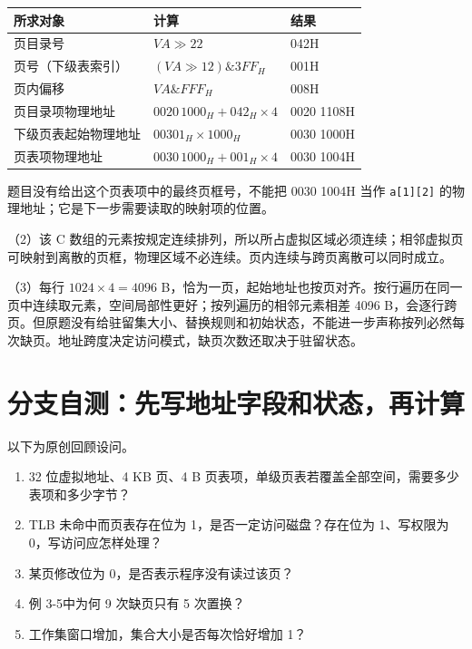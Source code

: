\begin{wideblock}

\par\medskip\noindent\begin{minipage}{\linewidth}\fontsize{9.3}{12}\selectfont\begin{tabularx}{\linewidth}{@{}YYY@{}}
\toprule\noalign{}
所求对象 & 计算 & 结果 \\
\midrule\noalign{}


页目录号 & \(VA\gg22\) & 042H \\
页号（下级表索引） & \((VA\gg12)\mathbin{\&}3FF_H\) & 001H \\
页内偏移 & \(VA\mathbin{\&}FFF_H\) & 008H \\
页目录项物理地址 & \(0020\,1000_H+042_H\times4\) & 0020 1108H \\
下级页表起始物理地址 & \(00301_H\times1000_H\) & 0030 1000H \\
页表项物理地址 & \(0030\,1000_H+001_H\times4\) & 0030 1004H \\
\bottomrule\end{tabularx}
\end{minipage}\par\medskip

\end{wideblock}

题目没有给出这个页表项中的最终页框号，不能把 0030 1004H 当作 \texttt{a[1][2]} 的物理地址；它是下一步需要读取的映射项的位置。

（2）该 C 数组的元素按规定连续排列，所以所占虚拟区域必须连续；相邻虚拟页可映射到离散的页框，物理区域不必连续。页内连续与跨页离散可以同时成立。

（3）每行 \(1024\times4=4096\) B，恰为一页，起始地址也按页对齐。按行遍历在同一页中连续取元素，空间局部性更好；按列遍历的相邻元素相差 4096 B，会逐行跨页。但原题没有给驻留集大小、替换规则和初始状态，不能进一步声称按列必然每次缺页。地址跨度决定访问模式，缺页次数还取决于驻留状态。

\section{分支自测：先写地址字段和状态，再计算}\label{OS03-5-review}

以下为原创回顾设问。

\begin{enumerate}
\def\labelenumi{\arabic{enumi}.}
\tightlist
\item
  32 位虚拟地址、4 KB 页、4 B 页表项，单级页表若覆盖全部空间，需要多少表项和多少字节？
\item
  TLB 未命中而页表存在位为 1，是否一定访问磁盘？存在位为 1、写权限为 0，写访问应怎样处理？
\item
  某页修改位为 0，是否表示程序没有读过该页？
\item
  例 3-5中为何 9 次缺页只有 5 次置换？
\item
  工作集窗口增加，集合大小是否每次恰好增加 1？
\end{enumerate}

